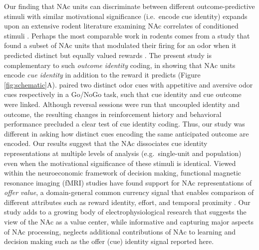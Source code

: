 \documentclass[11pt]{article}
\let\cite=\citep
\begin{document}
Our finding that NAc units can discriminate between different
outcome-predictive stimuli with similar motivational significance
(i.e.\ encode cue identity) expands upon an extensive rodent
literature examining NAc correlates of conditioned stimuli
\cite{Setlow2003,Nicola2004,Yun2004,Roitman2005,Day2006,Ambroggi2008,Ishikawa2008,Roesch2009a,Saddoris2011,Goldstein2012,Lansink2012,Bissonette2013,McGinty2013,Atallah2014,Sugam2014,Cooch2015,West2016,Dejean2017}. Perhaps
the most comparable work in rodents comes from a study that found a
subset of NAc units that modulated their firing for an odor when it
predicted distinct but equally valued rewards \cite{Cooch2015}. The
present study is complementary to such {\it outcome identity} coding,
in showing that NAc units encode {\it cue identity} in addition to the
reward it predicts (Figure
\ref{fig:schematic}A). \citeauthor{Setlow2003} paired two distinct
odor cues with appetitive and aversive odor cues respectively in a
Go/NoGo task, such that cue identity and cue outcome were
linked. Although reversal sessions were run that uncoupled identity
and outcome, the resulting changes in reinforcement history and
behavioral performance precluded a clear test of cue identity
coding. Thus, our study was different in asking how distinct cues
encoding the same anticipated outcome are encoded. Our results suggest
that the NAc dissociates cue identity representations at multiple
levels of analysis (e.g.\ single-unit and population) even when the
motivational significance of these stimuli is identical. Viewed within
the neuroeconomic framework of decision making, functional magnetic
resonance imaging (fMRI) studies have found support for NAc
representations of {\it offer value}, a domain-general common currency
signal that enables comparison of different attributes such as reward
identity, effort, and temporal proximity
\cite{Peters2009,Levy2012,Bartra2013,Sescousse2015}. Our study adds to
a growing body of electrophysiological research that suggests the view
of the NAc as a value center, while informative and capturing major
aspects of NAc processing, neglects additional contributions of NAc to
learning and decision making such as the offer (cue) identity signal
reported here.
\end{document}
